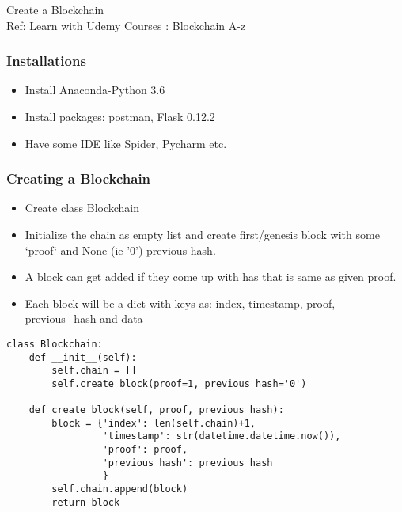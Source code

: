 \begin{frame}[fragile]\frametitle{}
\begin{center}
{\Large Create a Blockchain}\\
{\small Ref: Learn with Udemy Courses : Blockchain A-z}
\end{center}
\end{frame}

\begin{frame}[fragile]\frametitle{Installations}
\begin{itemize}
\item Install Anaconda-Python 3.6
\item Install packages: postman, Flask 0.12.2
\item Have some IDE like Spider, Pycharm etc.
\end{itemize}
\end{frame}

\begin{frame}[fragile]\frametitle{Creating a Blockchain}
\begin{itemize}
\item Create class Blockchain
\item Initialize the chain as empty list and create first/genesis block with some `proof` and None (ie '0') previous hash.
\item A block can get added if they come up with has that is same as given proof.
\item Each block will be a dict with keys as: index, timestamp, proof, previous\_hash and data
\end{itemize}

\begin{lstlisting}
class Blockchain:
    def __init__(self):
        self.chain = []
        self.create_block(proof=1, previous_hash='0')

    def create_block(self, proof, previous_hash):
        block = {'index': len(self.chain)+1,
                 'timestamp': str(datetime.datetime.now()),
                 'proof': proof,
                 'previous_hash': previous_hash
                 }
        self.chain.append(block)
        return block
\end{lstlisting}
\end{frame}


